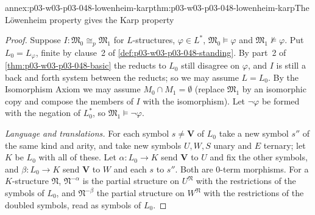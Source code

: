 \begin{annexitem}{annex:p03-w03-p03-048-lowenheim-karp}{thm:p03-w03-p03-048-lowenheim-karp}{The L\"owenheim property gives the Karp property}
\begin{proof}
Suppose \(I:\mathfrak M_0\cong_{p}\mathfrak M_1\) for \(L\)-structures,
\(\varphi\in L^{\ast}\), \(\mathfrak M_0\models\varphi\) and
\(\mathfrak M_1\not\models\varphi\).  Put \(L_0=L_\varphi\), finite by
clause~2 of \cref{def:p03-w03-p03-048-standing}.  By part~2 of
\cref{thm:p03-w03-p03-048-basic} the reducts to \(L_0\) still disagree on
\(\varphi\), and \(I\) is still a back and forth system between the reducts;
so we may assume \(L=L_0\).  By the Isomorphism Axiom we may assume
\(M_0\cap M_1=\emptyset\) (replace \(\mathfrak M_1\) by an isomorphic copy
and compose the members of \(I\) with the isomorphism).  Let
\(\neg\varphi\) be formed with the negation of \(L_0^{\ast}\), so
\(\mathfrak M_1\models\neg\varphi\).

\emph{Language and translations.}  For each symbol \(s\neq\mathbf V\) of
\(L_0\) take a new symbol \(s''\) of the same kind and arity, and take new
symbols \(U,W,S\) unary and \(E\) ternary; let \(K\) be \(L_0\) with all of
these.  Let \(\alpha:L_0\to K\) send \(\mathbf V\) to \(U\) and fix the other
symbols, and \(\beta:L_0\to K\) send \(\mathbf V\) to \(W\) and each \(s\) to
\(s''\).  Both are \(0\)-term morphisms.  For a \(K\)-structure
\(\mathfrak N\), \(\mathfrak N^{-\alpha}\) is the partial structure on
\(U^{\mathfrak N}\) with the restrictions of the symbols of \(L_0\), and
\(\mathfrak N^{-\beta}\) the partial structure on \(W^{\mathfrak N}\) with
the restrictions of the doubled symbols, read as symbols of \(L_0\).


\end{proof}
\end{annexitem}

